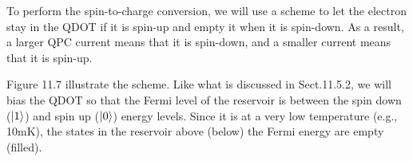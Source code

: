 \documentclass{article}
\begin{document}
To perform the spin-to-charge conversion, we will use a scheme to let the electron stay in the
QDOT if it is spin-up and empty it when it is spin-down. As a result, a larger QPC current means that
it is spin-down, and a smaller current means that it is spin-up.

Figure 11.7 illustrate the scheme. Like what is discussed in Sect.11.5.2, we will 
bias the QDOT so that the Fermi level of the reservoir is between the spin down ($\ket{1}$)
and spin up ($\ket{0}$) energy levels. Since it is at a very low temperature (e.g., 10mK), the states in the
reservoir above (below) the Fermi energy are empty (filled).
\end{document}
